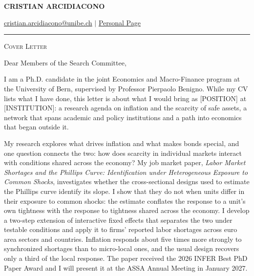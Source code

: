 \documentclass[11pt]{article}
\begin{document}
 
\begin{center}
    \textbf{\large \scshape CRISTIAN ARCIDIACONO}
\end{center}

\begin{center}
    {\href{mailto:cristian.arcidiacono@unibe.ch}{cristian.arcidiacono@unibe.ch} $\vert$ \href{https://sites.google.com/view/cristian-arcidiacono/home}{Personal Page}}
\end{center}
\vspace{-0.2cm}
\noindent\rule{\textwidth}{0.4pt}

\vspace{0.2cm}

\begin{center}
    {\large \scshape Cover Letter}
\end{center}

\vspace{0.3cm}

Dear Members of the Search Committee,

I am a Ph.D. candidate in the joint Economics and Macro-Finance program at the University of Bern, supervised by Professor Pierpaolo Benigno. While my CV lists what I have done, this letter is about what I would bring as [POSITION] at [INSTITUTION]: a research agenda on inflation and the scarcity of safe assets, a network that spans academic and policy institutions and a path into economics that began outside it.

My research explores what drives inflation and what makes bonds special, and one question connects the two: how does scarcity in individual markets interact with conditions shared across the economy? My job market paper, \textit{Labor Market Shortages and the Phillips Curve: Identification under Heterogeneous Exposure to Common Shocks}, investigates whether the cross-sectional designs used to estimate the Phillips curve identify its slope. I show that they do not when units differ in their exposure to common shocks: the estimate conflates the response to a unit's own tightness with the response to tightness shared across the economy. I develop a two-step extension of interactive fixed effects that separates the two under testable conditions and apply it to firms' reported labor shortages across euro area sectors and countries. Inflation responds about five times more strongly to synchronized shortages than to micro-local ones, and the usual design recovers only a third of the local response. The paper received the 2026 INFER Best PhD Paper Award and I will present it at the ASSA Annual Meeting in January 2027.
\end{document}
